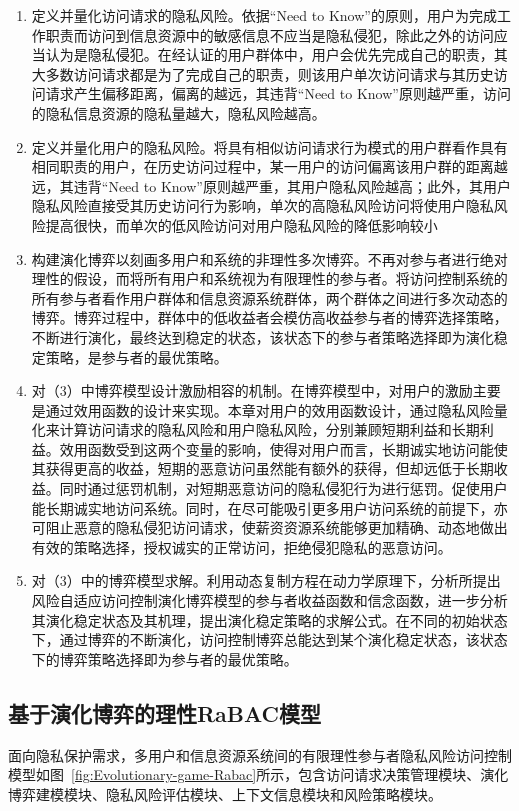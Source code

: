 \begin{enumerate}
	\item 定义并量化访问请求的隐私风险。依据“Need to Know”的原则，用户为完成工作职责而访问到信息资源中的敏感信息不应当是隐私侵犯，除此之外的访问应当认为是隐私侵犯。在经认证的用户群体中，用户会优先完成自己的职责，其大多数访问请求都是为了完成自己的职责，则该用户单次访问请求与其历史访问请求产生偏移距离，偏离的越远，其违背“Need to Know”原则越严重，访问的隐私信息资源的隐私量越大，隐私风险越高。
	\item 定义并量化用户的隐私风险。将具有相似访问请求行为模式的用户群看作具有相同职责的用户，在历史访问过程中，某一用户的访问偏离该用户群的距离越远，其违背“Need to Know”原则越严重，其用户隐私风险越高；此外，其用户隐私风险直接受其历史访问行为影响，单次的高隐私风险访问将使用户隐私风险提高很快，而单次的低风险访问对用户隐私风险的降低影响较小
	\item 构建演化博弈以刻画多用户和系统的非理性多次博弈。不再对参与者进行绝对理性的假设，而将所有用户和系统视为有限理性的参与者。将访问控制系统的所有参与者看作用户群体和信息资源系统群体，两个群体之间进行多次动态的博弈。博弈过程中，群体中的低收益者会模仿高收益参与者的博弈选择策略，不断进行演化，最终达到稳定的状态，该状态下的参与者策略选择即为演化稳定策略，是参与者的最优策略。
	\item 对（3）中博弈模型设计激励相容的机制。在博弈模型中，对用户的激励主要是通过效用函数的设计来实现。本章对用户的效用函数设计，通过隐私风险量化来计算访问请求的隐私风险和用户隐私风险，分别兼顾短期利益和长期利益。效用函数受到这两个变量的影响，使得对用户而言，长期诚实地访问能使其获得更高的收益，短期的恶意访问虽然能有额外的获得，但却远低于长期收益。同时通过惩罚机制，对短期恶意访问的隐私侵犯行为进行惩罚。促使用户能长期诚实地访问系统。同时，在尽可能吸引更多用户访问系统的前提下，亦可阻止恶意的隐私侵犯访问请求，使薪资资源系统能够更加精确、动态地做出有效的策略选择，授权诚实的正常访问，拒绝侵犯隐私的恶意访问。
	\item 对（3）中的博弈模型求解。利用动态复制方程在动力学原理下，分析所提出风险自适应访问控制演化博弈模型的参与者收益函数和信念函数，进一步分析其演化稳定状态及其机理，提出演化稳定策略的求解公式。在不同的初始状态下，通过博弈的不断演化，访问控制博弈总能达到某个演化稳定状态，该状态下的博弈策略选择即为参与者的最优策略。
\end{enumerate}

\subsection{基于演化博弈的理性RaBAC模型}
面向隐私保护需求，多用户和信息资源系统间的有限理性参与者隐私风险访问控制模型如图~\ref{fig:Evolutionary-game-Rabac}所示，包含访问请求决策管理模块、演化博弈建模模块、隐私风险评估模块、上下文信息模块和风险策略模块。

